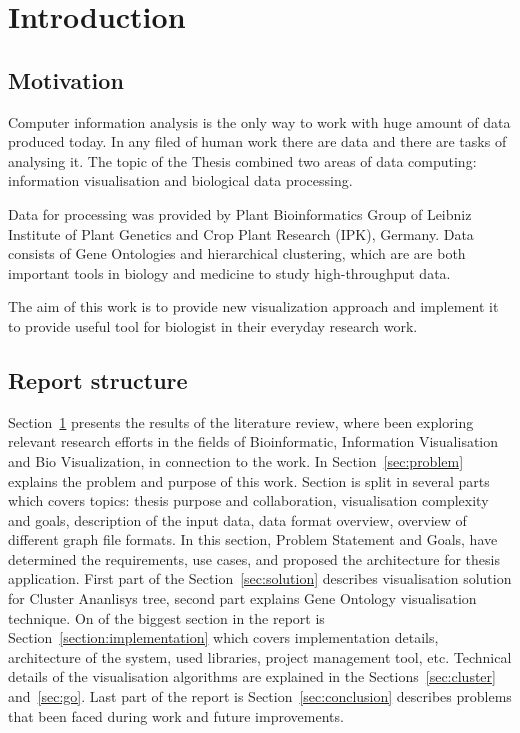 \section{Introduction}
\label{sec:introduction}

\subsection{Motivation}
\label{sec:motivation}

Computer information analysis is the only way to work with huge amount of data produced today. In any filed of human work there are data and there are tasks of analysing it. The topic of the Thesis combined two areas of data computing: information visualisation and biological data processing.

Data for processing was provided by Plant Bioinformatics Group of Leibniz Institute of Plant Genetics and Crop Plant Research (IPK), Germany. Data consists of Gene Ontologies and hierarchical clustering, which are are both important tools in biology and medicine to study high-throughput data.

The aim of this work is to provide new visualization approach and implement it to provide useful tool for biologist in their everyday research work.

\subsection{Report structure}
\label{sec:structure}

Section~\ref{sec:introduction} presents the results of the literature review, where been exploring relevant research efforts in the fields of Bioinformatic, Information Visualisation and Bio Visualization, in connection to the work. In Section~\ref{sec:problem} explains the problem and purpose of this work. Section is split in several parts which covers topics: thesis purpose and collaboration, visualisation complexity and goals, description of the input data, data format overview, overview of different graph file formats. In this section, Problem Statement and Goals, have determined the requirements, use cases, and proposed the architecture for thesis application. First part of the Section~\ref{sec:solution} describes visualisation solution for Cluster Ananlisys tree, second part explains Gene Ontology visualisation technique. On of the biggest section in the report is Section~\ref{section:implementation} which covers implementation details, architecture of the system, used libraries, project management tool, etc. Technical details of the visualisation algorithms are explained in the Sections~\ref{sec:cluster} and~\ref{sec:go}. Last part of the report is Section~\ref{sec:conclusion} describes problems that been faced during work and future improvements.

